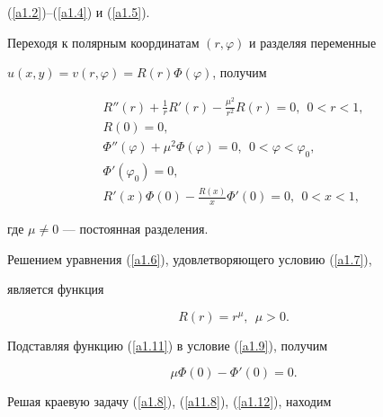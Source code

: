 (\ref{a1.2})--(\ref{a1.4}) и (\ref{a1.5}).





Переходя к полярным координатам $(r,\varphi)$ и разделяя переменные


$u(x,y)=v(r,\varphi)=R(r)\Phi(\varphi)$, получим


\begin{gather}


R''(r)+\frac{1}{r}R'(r)-\frac{\mu^2}{r^2}R(r)=0,


\ \ 0<r<1,\label{a1.6} \\


%


R(0)=0,\label{a1.7} \\


%


\Phi''(\varphi)+\mu^2\Phi(\varphi)=0,\ \ 0<\varphi<\varphi_0,\label{a1.8}\\


%


\Phi'(\varphi_0)=0,\label{a11.8} \\


%


R'(x)\Phi(0)-\frac{R(x)}{x}\Phi'(0)=0,\ \ 0<x<1,\label{a1.9}


\end{gather}


где $\mu\ne 0$ --- постоянная разделения.





Решением уравнения (\ref{a1.6}), удовлетворяющего условию (\ref{a1.7}), 


является функция


\begin{equation}


R(r)=r^\mu,\ \ \mu>0.\label{a1.11}


\end{equation}





Подставляя функцию (\ref{a1.11}) в условие (\ref{a1.9}), получим


\begin{equation}


\mu\Phi(0)-\Phi'(0)=0.\label{a1.12}


\end{equation}





Решая краевую задачу (\ref{a1.8}), (\ref{a11.8}), (\ref{a1.12}), находим


